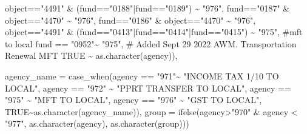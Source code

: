 \documentclass[
  letterpaper,
  DIV=11,
  numbers=noendperiod]{scrreport}
\newenvironment{Shaded}{\begin{snugshade}}{\end{snugshade}}
\newcommand{\AttributeTok}[1]{\textcolor[rgb]{0.40,0.45,0.13}{#1}}
\newcommand{\CommentTok}[1]{\textcolor[rgb]{0.37,0.37,0.37}{#1}}
\newcommand{\ConstantTok}[1]{\textcolor[rgb]{0.56,0.35,0.01}{#1}}
\newcommand{\FunctionTok}[1]{\textcolor[rgb]{0.28,0.35,0.67}{#1}}
\newcommand{\NormalTok}[1]{\textcolor[rgb]{0.00,0.23,0.31}{#1}}
\newcommand{\SpecialCharTok}[1]{\textcolor[rgb]{0.37,0.37,0.37}{#1}}
\newcommand{\StringTok}[1]{\textcolor[rgb]{0.13,0.47,0.30}{#1}}
\begin{document}
\begin{Shaded}
\begin{Highlighting}[]
\NormalTok{                    object}\SpecialCharTok{==}\StringTok{"4491"} \SpecialCharTok{\&}\NormalTok{ (fund}\SpecialCharTok{==}\StringTok{"0188"}\SpecialCharTok{|}\NormalTok{fund}\SpecialCharTok{==}\StringTok{"0189"}\NormalTok{) }\SpecialCharTok{\textasciitilde{}} \StringTok{"976"}\NormalTok{,}
\NormalTok{                     fund}\SpecialCharTok{==}\StringTok{"0187"} \SpecialCharTok{\&}\NormalTok{ object}\SpecialCharTok{==}\StringTok{"4470"} \SpecialCharTok{\textasciitilde{}} \StringTok{"976"}\NormalTok{,}
\NormalTok{                     fund}\SpecialCharTok{==}\StringTok{"0186"} \SpecialCharTok{\&}\NormalTok{ object}\SpecialCharTok{==}\StringTok{"4470"} \SpecialCharTok{\textasciitilde{}} \StringTok{"976"}\NormalTok{,}
\NormalTok{                    object}\SpecialCharTok{==}\StringTok{"4491"} \SpecialCharTok{\&}\NormalTok{ (fund}\SpecialCharTok{==}\StringTok{"0413"}\SpecialCharTok{|}\NormalTok{fund}\SpecialCharTok{==}\StringTok{"0414"}\SpecialCharTok{|}\NormalTok{fund}\SpecialCharTok{==}\StringTok{"0415"}\NormalTok{)  }\SpecialCharTok{\textasciitilde{}} \StringTok{"975"}\NormalTok{, }\CommentTok{\#mft to local}
\NormalTok{                  fund }\SpecialCharTok{==} \StringTok{"0952"}\SpecialCharTok{\textasciitilde{}} \StringTok{"975"}\NormalTok{, }\CommentTok{\# Added Sept 29 2022 AWM. Transportation Renewal MFT}
                    \ConstantTok{TRUE} \SpecialCharTok{\textasciitilde{}} \FunctionTok{as.character}\NormalTok{(agency)),}
  
  \AttributeTok{agency\_name =} \FunctionTok{case\_when}\NormalTok{(agency }\SpecialCharTok{==} \StringTok{"971"}\SpecialCharTok{\textasciitilde{}} \StringTok{"INCOME TAX 1/10 TO LOCAL"}\NormalTok{,}
\NormalTok{                          agency }\SpecialCharTok{==} \StringTok{"972"} \SpecialCharTok{\textasciitilde{}} \StringTok{"PPRT TRANSFER TO LOCAL"}\NormalTok{,}
\NormalTok{                          agency }\SpecialCharTok{==} \StringTok{"975"} \SpecialCharTok{\textasciitilde{}} \StringTok{"MFT TO LOCAL"}\NormalTok{,}
\NormalTok{                          agency }\SpecialCharTok{==} \StringTok{"976"} \SpecialCharTok{\textasciitilde{}} \StringTok{"GST TO LOCAL"}\NormalTok{,}
                          \ConstantTok{TRUE}\SpecialCharTok{\textasciitilde{}}\FunctionTok{as.character}\NormalTok{(agency\_name)),}
  \AttributeTok{group =} \FunctionTok{ifelse}\NormalTok{(agency}\SpecialCharTok{\textgreater{}}\StringTok{"970"} \SpecialCharTok{\&}\NormalTok{ agency }\SpecialCharTok{\textless{}} \StringTok{"977"}\NormalTok{, }\FunctionTok{as.character}\NormalTok{(agency), }\FunctionTok{as.character}\NormalTok{(group)))}
\end{Highlighting}
\end{Shaded}
\end{document}
